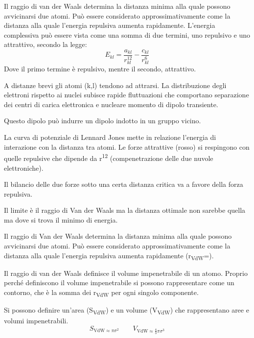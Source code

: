 Il raggio di van der Waals determina la
distanza minima alla quale possono
avvicinarsi due atomi. Può essere
considerato approssimativamente come la
distanza alla quale l’energia repulsiva
aumenta rapidamente. L'energia complessiva può essere vista come una somma di due termini, uno repulsivo e uno attrattivo, secondo la legge:
\[
  E_{kl} = \frac{a_{kl}}{r_{kl}^{12}} - \frac{c_{kl}}{r_{kl}^6}
\]
Dove il primo termine è repulsivo, mentre il secondo, attrattivo.

A distanze brevi gli atomi (k,l) tendono ad attrarsi. La distribuzione
degli elettroni rispetto ai nuclei subisce rapide fluttuazioni che
comportano separazione dei centri di carica elettronica e nucleare momento di dipolo transiente.


Questo dipolo può indurre un dipolo indotto in un gruppo vicino.

La curva di potenziale di Lennard Jones mette in relazione l'energia di
interazione con la distanza tra atomi. Le forze attrattive (rosso) si
respingono con quelle repulsive che dipende da r\textsuperscript{12}
(compenetrazione delle due nuvole elettroniche).


Il bilancio delle due forze sotto una certa distanza critica va a favore
della forza repulsiva.

Il limite è il raggio di Van der Waals ma la distanza ottimale non
sarebbe quella ma dove si trova il minimo di energia.

Il raggio di Van der Waals determina la distanza minima alla quale possono
avvicinarsi due atomi. Può essere considerato approssimativamente come
la distanza alla quale l'energia repulsiva aumenta rapidamente
(r\textsubscript{VdW}=\sigma).


Il raggio di van der Waals definisce il volume impenetrabile di un atomo.
Proprio perché definiscono il volume impenetrabile si possono
rappresentare come un contorno, che è la somma dei r\textsubscript{VdW}
per ogni singolo componente.

Si possono definire un'area (S\textsubscript{VdW}) e un volume
(V\textsubscript{VdW}) che rappresentano aree e volumi impenetrabili.
\[
  S_{\text{VdW} \approx \pi \sigma^2} \qquad V_{\text{VdW} \approx \frac{4}{3} \pi \sigma^3}
\]

